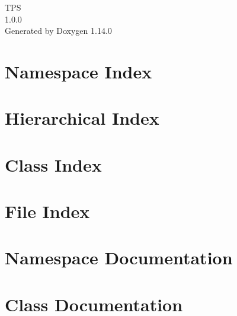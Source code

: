 \documentclass[twoside]{book}
\newcommand{\+}{\discretionary{\mbox{\scriptsize$\hookleftarrow$}}{}{}}
\newcommand{\clearemptydoublepage}{%
    \newpage{\pagestyle{empty}\cleardoublepage}%
  }
\begin{document}
  \raggedbottom
    \hypersetup{pageanchor=false,
                bookmarksnumbered=true,
                pdfencoding=unicode
               }
  \begin{titlepage}
  \vspace*{7cm}
  \begin{center}%
  {\Large TPS}\\
  [1ex]\large 1.\+0.\+0 \\
  \vspace*{1cm}
  {\large Generated by Doxygen 1.14.0}\\
  \end{center}
  \end{titlepage}
  \clearemptydoublepage
  \tableofcontents
  \clearemptydoublepage
  \hypersetup{pageanchor=true}


\chapter{Namespace Index}

\chapter{Hierarchical Index}

\chapter{Class Index}

\chapter{File Index}

\chapter{Namespace Documentation}


\chapter{Class Documentation}



























\end{document}
